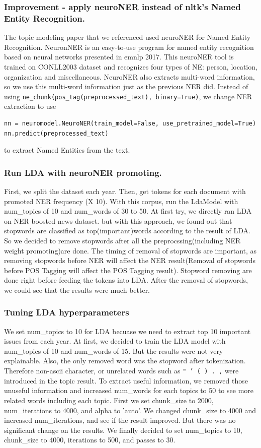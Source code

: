 \subsubsection{Improvement - apply neuroNER instead of nltk's Named Entity Recognition.} 
The topic modeling paper that we referenced used neuroNER for Named Entity Recognition. NeuronNER is an easy-to-use program for named entity recognition based on neural networks presented in emnlp 2017. \cite{2017neuroner} This neuroNER tool is trained on CONLL2003 dataset and recognizes four types of NE: person, location, organization and miscellaneous. NeuroNER also extracts multi-word information, so we use this multi-word information just as the previous NER did. Instead of using \texttt{ne_chunk(pos_tag(preprocessed_text), binary=True)}, we change NER extraction to use
\begin{verbatim}
nn = neuromodel.NeuroNER(train_model=False, use_pretrained_model=True)
nn.predict(preprocessed_text)
\end{verbatim}
to extract Named Entities from the text.

\subsubsection{Run LDA with neuroNER promoting.}
First, we split the dataset each year. Then, get tokens for each document with promoted NER frequency (X 10). With this corpus, run the LdaModel with num\_topics of 10 and num\_words of 30 to 50. At first try, we directly ran LDA on NER boosted news dataset. but with this approach, we found out that stopwords are classified as top(important)words according to the result of LDA. So we decided to remove stopwords after all the preprocssing(including NER weight promoting)are done. The timing of removal of stopwords are important, as removing stopwords before NER will affect the NER result(Removal of stopwords before POS Tagging will affect the POS Tagging result). Stopword removing are done right before feeding the tokens into LDA. After the removal of stopwords, we could see that the results were much better.

\subsubsection{Tuning LDA hyperparameters}
We set num\_topics to 10 for LDA becuase we need to extract top 10 important issues from each year. At first, we decided to train the LDA model with num\_topics of 10 and num\_words of 15. But the results were not very explainable. Also, the only removed word was the stopword after tokenization. Therefore non-ascii character, or unrelated words such as \texttt{" \xec ' ( ) . ,} were introduced in the topic result. To extract useful information, we removed those unuseful information and increased num\_words for each topics to 50 to see more related words including each topic. First we set chunk\_size to 2000, num\_iterations to 4000, and alpha to 'auto'. We changed chunk\_size to 4000 and increased num\_iterations, and see if the result improved. But there was no significant change on the results. We finally decided to set num\_topics to 10, chunk\_size to 4000, iterations to 500, and passes to 30.
